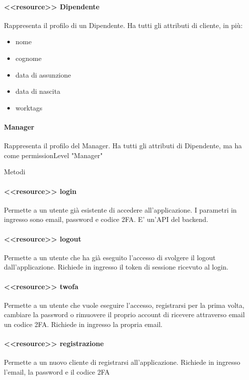 \documentclass{report}
\begin{document}
\paragraph*{<<resource>> Dipendente}
Rappresenta il profilo di un Dipendente.
Ha tutti gli attributi di cliente, in più:
\begin{itemize}
	\item nome
	\item cognome
	\item data di assunzione
	\item data di nascita
	\item worktags
\end{itemize}
\paragraph*{Manager}
Rappresenta il profilo del Manager.
Ha tutti gli attributi di Dipendente, ma ha come permissionLevel "Manager"

Metodi
\paragraph*{<<resource>> login}
Permette a un utente già esistente di accedere all'applicazione.
I parametri in ingresso sono email, password e codice 2FA.
E' un'API del backend.

\paragraph*{<<resource>> logout}
Permette a un utente che ha già eseguito l'accesso di svolgere il logout dall'applicazione.
Richiede in ingresso il token di sessione ricevuto al login.

\paragraph*{<<resource>> twofa}
Permette a un utente che vuole eseguire l'accesso, registrarsi per la prima volta, cambiare la password o rimuovere il proprio account di ricevere attraverso email un codice 2FA.
Richiede in ingresso la propria email.

\paragraph*{<<resource>> registrazione}
Permette a un nuovo cliente di registrarsi all'applicazione.
Richiede in ingresso l'email, la password e il codice 2FA
\end{document}
